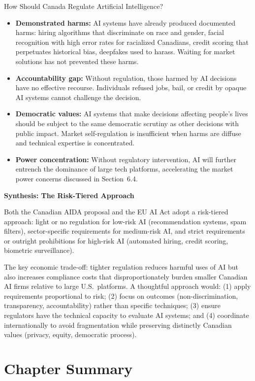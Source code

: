 \begin{policydebate}{How Should Canada Regulate Artificial Intelligence?}
\begin{itemize}
  \item \textbf{Demonstrated harms:} AI systems have already produced documented harms: hiring algorithms that discriminate on race and gender, facial recognition with high error rates for racialized Canadians, credit scoring that perpetuates historical bias, deepfakes used to harass. Waiting for market solutions has not prevented these harms.
  \item \textbf{Accountability gap:} Without regulation, those harmed by AI decisions have no effective recourse. Individuals refused jobs, bail, or credit by opaque AI systems cannot challenge the decision.
  \item \textbf{Democratic values:} AI systems that make decisions affecting people's lives should be subject to the same democratic scrutiny as other decisions with public impact. Market self-regulation is insufficient when harms are diffuse and technical expertise is concentrated.
  \item \textbf{Power concentration:} Without regulatory intervention, AI will further entrench the dominance of large tech platforms, accelerating the market power concerns discussed in Section~6.4.
\end{itemize}

\textbf{Synthesis: The Risk-Tiered Approach}

Both the Canadian AIDA proposal and the EU AI Act adopt a risk-tiered approach: light or no regulation for low-risk AI (recommendation systems, spam filters), sector-specific requirements for medium-risk AI, and strict requirements or outright prohibitions for high-risk AI (automated hiring, credit scoring, biometric surveillance).

The key economic trade-off: tighter regulation reduces harmful uses of AI but also increases compliance costs that disproportionately burden smaller Canadian AI firms relative to large U.S.\ platforms. A thoughtful approach would: (1) apply requirements proportional to risk; (2) focus on outcomes (non-discrimination, transparency, accountability) rather than specific techniques; (3) ensure regulators have the technical capacity to evaluate AI systems; and (4) coordinate internationally to avoid fragmentation while preserving distinctly Canadian values (privacy, equity, democratic process).
\end{policydebate}

\section*{Chapter Summary}

